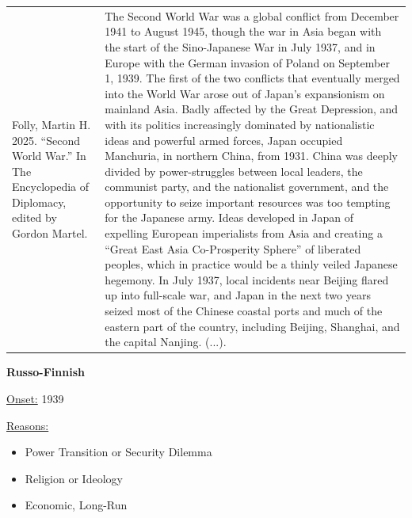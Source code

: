 {\begin{longtable}{p{}p{}}
\\
Folly, Martin H. 2025. “Second World War.” In The Encyclopedia of Diplomacy, edited by Gordon Martel. & The Second World War was a global conflict from December 1941 to August 1945, though the war in Asia began with the start of the Sino-Japanese War in July 1937, and in Europe with the German invasion of Poland on September 1, 1939. The first of the two conflicts that eventually merged into the World War arose out of Japan's expansionism on mainland Asia. Badly affected by the Great Depression, and with its politics increasingly dominated by nationalistic ideas and powerful armed forces, Japan occupied Manchuria, in northern China, from 1931. China was deeply divided by power-struggles between local leaders, the communist party, and the nationalist government, and the opportunity to seize important resources was too tempting for the Japanese army. Ideas developed in Japan of expelling European imperialists from Asia and creating a “Great East Asia Co-Prosperity Sphere” of liberated peoples, which in practice would be a thinly veiled Japanese hegemony. In July 1937, local incidents near Beijing flared up into full-scale war, and Japan in the next two years seized most of the Chinese coastal ports and much of the eastern part of the country, including Beijing, Shanghai, and the capital Nanjing. (...).

\\
\end{longtable}}
\clearpage
         \textbf{Russo-Finnish} 

          \underline{Onset:} 1939         

\underline{Reasons:}
\begin{itemize}
\item Power Transition or Security Dilemma
\item Religion or Ideology
\item Economic, Long-Run
\end{itemize}

